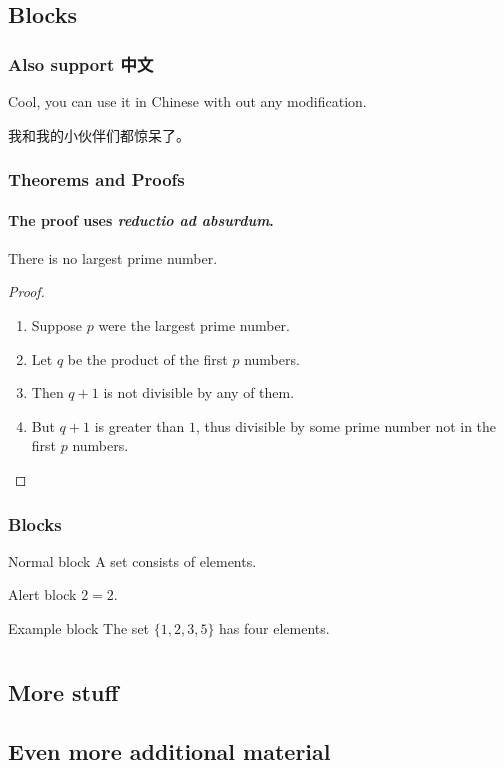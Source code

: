 \documentclass[aspectratio=169,handout]{beamer}
\begin{document}
    \subsection{Blocks}
    \begin{frame}
        \frametitle{Also support 中文}
        Cool, you can use it in Chinese with out any modification.\par
        我和我的小伙伴们都惊呆了。
    \end{frame}
    \begin{frame}
        \frametitle{Theorems and Proofs}
        \framesubtitle{The proof uses \textit{reductio ad absurdum}.}
        \begin{theorem}
            There is no largest prime number.
        \end{theorem}
        \begin{proof}
            \begin{enumerate}
                \item<1-| alert@1> Suppose $p$ were the largest prime number.
                \item<2-> Let $q$ be the product of the first $p$ numbers.
                \item<3-> Then $q+1$ is not divisible by any of them.
                \item<1-> But $q + 1$ is greater than $1$, thus divisible by some prime
                number not in the first $p$ numbers.\qedhere
            \end{enumerate}
        \end{proof}
    \end{frame}


    \begin{frame}
        \frametitle{Blocks}

        \begin{block}{Normal block}
            A \alert{set} consists of elements.
        \end{block}

        \begin{alertblock}{Alert block}
            $2=2$.
        \end{alertblock}

        \begin{exampleblock}{Example block}
            The set $\{1,2,3,5\}$ has four elements.
        \end{exampleblock}

    \end{frame}

    \appendix

    \section{\appendixname}

    \subsection{More stuff}

    \subsection{Even more additional material}
\end{document}
